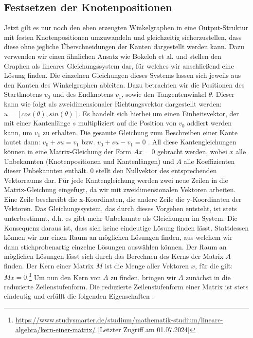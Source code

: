 \subsection{Festsetzen der Knotenpositionen}
Jetzt gilt es nur noch den eben erzeugten Winkelgraphen in eine Output-Struktur mit festen Knotenpositionen umzuwandeln und gleichzeitig sicherzustellen,
dass diese ohne jegliche Überschneidungen der Kanten dargestellt werden kann. Dazu verwenden wir einen ähnlichen Ansatz wie Bokeloh et al. \cite{4_bokeloh_et_al}
und stellen den Graphen als lineares Gleichungssystem dar, für welches wir anschließend eine Lösung finden. Die einzelnen Gleichungen dieses Systems lassen
sich jeweils aus den Kanten des Winkelgraphen ableiten. Dazu betrachten wir die Positionen des Startknotens \(v_0\) und des Endknotens \(v_1\), sowie den
Tangentenwinkel \(\theta\). Dieser kann wie folgt als zweidimensionaler Richtungsvektor dargestellt werden: \(u = [cos(\theta), sin(\theta)]\). Es handelt
sich hierbei um einen Einheitsvektor, der mit einer Kantenlänge \(s\) multipliziert auf die Position von \(v_0\) addiert werden kann, um \(v_1\) zu erhalten.
Die gesamte Gleichung zum Beschreiben einer Kante lautet dann: \(v_0 + su = v_1\) bzw. \(v_0 + su - v_1 = 0\) \cite{1_merrell}. All diese Kantengleichungen können in eine
Matrix-Gleichung der Form \(Ax = 0\) gebracht werden, wobei \(x\) alle Unbekannten (Knotenpositionen und Kantenlängen) und \(A\) alle Koeffizienten dieser
Unbekannten enthält. \(0\) stellt den Nullvektor des entsprechenden Vektorraums dar. Für jede Kantengleichung werden zwei neue Zeilen in die Matrix-Gleichung
eingefügt, da wir mit zweidimensionalen Vektoren arbeiten. Eine Zeile beschreibt die x-Koordinaten, die andere Zeile die y-Koordinaten der Vektoren.
Das Gleichungssystem, das durch dieses Vorgehen entsteht, ist stets
unterbestimmt, d.h. es gibt mehr Unbekannte als Gleichungen im System. Die Konsequenz daraus ist, dass sich keine eindeutige Lösung finden lässt.
Stattdessen können wir nur einen Raum an möglichen Lösungen finden, aus welchem wir dann stichprobenartig einzelne Lösungen auswählen können. Der Raum an
möglichen Lösungen lässt sich durch das Berechnen des Kerns der Matrix \(A\) finden. Der Kern einer Matrix \(M\) ist die Menge aller Vektoren \(x\), für die gilt:
\(Mx = 0\).\footnote{\url{https://www.studysmarter.de/studium/mathematik-studium/lineare-algebra/kern-einer-matrix/} [Letzter Zugriff am 01.07.2024]} Um nun den
Kern von \(A\) zu finden, bringen wir \(A\) zunächst in die reduzierte Zeilenstufenform. Die reduzierte Zeilenstufenform einer Matrix ist stets eindeutig und
erfüllt die folgenden Eigenschaften \cite{47_meyer}:

